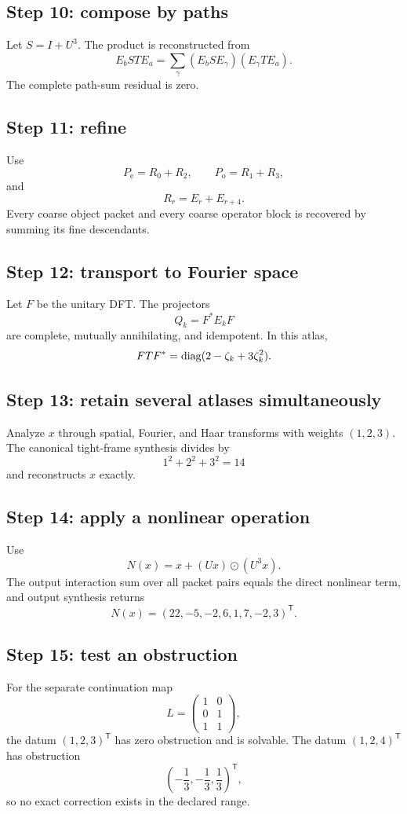 \subsection{Step 10: compose by paths}
Let $S=I+U^3$.  The product is reconstructed from
\[
E_bSTE_a
=
\sum_\gamma(E_bSE_\gamma)(E_\gamma TE_a).
\]
The complete path-sum residual is zero.

\subsection{Step 11: refine}
Use
\[
P_{\mathrm e}=R_0+R_2,
\qquad
P_{\mathrm o}=R_1+R_3,
\]
and
\[
R_r=E_r+E_{r+4}.
\]
Every coarse object packet and every coarse operator block is recovered by summing its fine descendants.

\subsection{Step 12: transport to Fourier space}
Let $F$ be the unitary DFT.  The projectors
\[
Q_k=F^*E_kF
\]
are complete, mutually annihilating, and idempotent.  In this atlas,
\[
FTF^*
=
\operatorname{diag}(2-\zeta_k+3\zeta_k^2).
\]


\subsection{Step 13: retain several atlases simultaneously}
Analyze $x$ through spatial, Fourier, and Haar transforms with weights $(1,2,3)$.  The canonical tight-frame synthesis divides by
\[
1^2+2^2+3^2=14
\]
and reconstructs $x$ exactly.

\subsection{Step 14: apply a nonlinear operation}
Use
\[
N(x)=x+(Ux)\odot(U^3x).
\]
The output interaction sum over all packet pairs equals the direct nonlinear term, and output synthesis returns
\[
N(x)=(22,-5,-2,6,1,7,-2,3)^{\mathsf T}.
\]

\subsection{Step 15: test an obstruction}
For the separate continuation map
\[
L=\begin{pmatrix}1&0\\0&1\\1&1\end{pmatrix},
\]
the datum $(1,2,3)^{\mathsf T}$ has zero obstruction and is solvable.  The datum $(1,2,4)^{\mathsf T}$ has obstruction
\[
\left(-\frac13,-\frac13,\frac13\right)^{\mathsf T},
\]
so no exact correction exists in the declared range.

